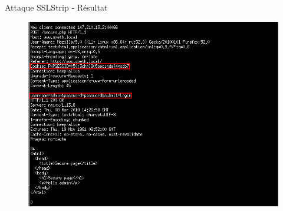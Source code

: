 \begin{frame}{Attaque SSLStrip - Résultat}
    \begin{figure}
    \includegraphics[width=0.9\linewidth]{../medias/sslstrip/screen7.png}
  \end{figure}
\end{frame}
